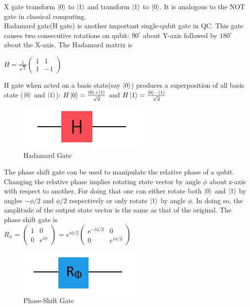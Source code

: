 X gate transform $\ket{0}$ to $\ket{1}$ and  transform $\ket{1}$ to $\ket{0}$. It is analogous to the NOT gate in classical computing.\\ 
Hadamard gate(H gate) is another important single-qubit gate in \acrshort{QC}. This gate causes two consecutive rotations on qubit: $90^{\circ}$ about Y-axis followed by $180^{\circ}$ about the X-axis. The Hadamard matrix is
\begin{center}$H = \frac{1}{\sqrt{2}}\begin{pmatrix}1 &1 \\1 &-1\end{pmatrix}  $\end{center}
H gate when acted on a basis state(say $\ket{0}$) produces a superposition of all basis state ($\ket{0}$ and $\ket{1}$):
$H\ket{0} = \frac{\ket{0} +\ket{1}}{\sqrt{2}}$ and $H\ket{1} = \frac{\ket{0} -\ket{1}}{\sqrt{2}}$

\begin{figure}[H]
    \centering
    \includegraphics{figures/Hadamard.PNG} 
    \caption{Hadamard Gate }
    \label{fig:hadamard_gate}
\end{figure}

The phase shift gate can be used to manipulate the relative phase of a qubit. Changing the relative phase implies rotating state vector by angle $\phi$ about z-axis with respect to another. For doing that one can either rotate both $\ket{0}$ and $\ket{1}$ by angles $- \phi/2$ and $\phi/2$ respectively or only rotate $\ket{1}$ by angle $\phi$. In doing so, the amplitude of the output state vector is the same as that of the original. The phase shift gate is
\\$R_{\phi}$ = $\begin{pmatrix}1 &0 \\ 0 &e^{i\phi} \end{pmatrix}$ = $e^{i\phi/2}\begin{pmatrix} e^{-i\phi/2} &0 \\ 0 &e^{i\phi/2} \end{pmatrix}$ 
\begin{figure}[H]
    \centering
    \includegraphics{figures/phasegate.PNG} 
    \caption{Phase-Shift Gate }
    \label{fig: phase_shiftgate}
\end{figure}

